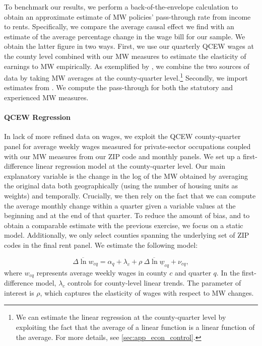 To benchmark our results, we perform a back-of-the-envelope calculation to obtain an 
approximate estimate of MW policies' pass-through rate from income to rents. Specifically, 
we compare the average causal effect we find with an estimate of the average percentage 
change in the wage bill for our sample. We obtain the latter figure in two ways. First, we 
use our quarterly QCEW wages at the county level combined with our MW measures 
to estimate the elasticity of earnings to MW empirically. As exemplified by 
\textcite{gentzkow2015newspapers}, we combine the two sources of data by taking MW averages 
at the county-quarter level.\footnote{We can estimate the linear regression at the 
	county-quarter level by exploiting the fact that the average of a linear function is a 
	linear function of the average. For more details, see \autoref{sec:app_econ_control}.} 
Secondly, we import estimates from \textcite{CegnizEtAl2019}. We compute the pass-through for
both the statutory and experienced MW measures.


\paragraph{QCEW Regression} In lack of more refined data on wages, we exploit the QCEW 
county-quarter panel for average weekly wages measured for private-sector occupations coupled 
with our MW measures from our ZIP code and monthly panels. We set up a first-difference linear 
regression model at the county-quarter level. Our main explanatory variable is the change in 
the log of the MW obtained by averaging the original data both geographically (using the number 
of housing units as weights) and temporally. Crucially, we then rely on the fact that we can 
compute the average monthly change within a quarter given a variable values at the beginning 
and at the end of that quarter. To reduce the amount of bias, and to obtain a comparable 
estimate with the previous exercise, we focus on a static model. Additionally, we only 
select counties spanning the underlying set of ZIP codes in the final rent panel. We estimate 
the following model:

\begin{equation}
	\overline{\Delta \ln w}_{cq} = \alpha_{q} + \lambda_{c} 
							+ \rho \ \overline{\Delta \ln \underline{w}}_{cq}
							+ \nu_{cq} ,
\end{equation}
where $w_{cq}$ represents average weekly wages in county $c$ and quarter $q$. In the 
first-difference model, $\lambda_{c}$ controls for county-level linear trends. The parameter of 
interest is $\rho$, which captures the elasticity of wages with respect to MW changes.

